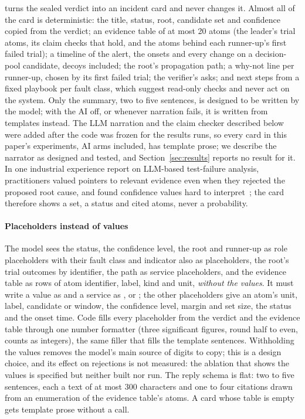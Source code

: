  turns the sealed verdict into an incident card and never changes it.
Almost all of the card is deterministic: the title, status, root, candidate set and confidence copied from the verdict; an evidence table of at most 20 atoms (the leader's trial atoms, its claim checks that hold, and the atoms behind each runner-up's first failed trial); a timeline of the alert, the onsets and every change on a decision-pool candidate, decoys included; the root's propagation path; a why-not line per runner-up, chosen by its first failed trial; the verifier's asks; and next steps from a fixed playbook per fault class, which suggest read-only checks and never act on the system.
Only the summary, two to five sentences, is designed to be written by the model; with the AI off, or whenever narration fails, it is written from templates instead.
The LLM narration and the claim checker described below were added after the code was frozen for the results runs, so every card in this paper's experiments, AI arms included, has template prose; we describe the narrator as designed and tested, and Section~\ref{sec:results} reports no result for it.
In one industrial experience report on LLM-based test-failure analysis, practitioners valued pointers to relevant evidence even when they rejected the proposed root cause, and found confidence values hard to interpret~\cite{westermo2026}; the card therefore shows a set, a status and cited atoms, never a probability.

\paragraph{Placeholders instead of values}
The model sees the status, the confidence level, the root and runner-up as role placeholders with their fault class and indicator also as placeholders, the root's trial outcomes by identifier, the path as service placeholders, and the evidence table as rows of atom identifier, label, kind and unit, \emph{without the values}.
It must write a value as  and a service as ,  or ; the other placeholders give an atom's unit, label, candidate or window, the confidence level, margin and set size, the status and the onset time.
Code fills every placeholder from the verdict and the evidence table through one number formatter (three significant figures, round half to even, counts as integers), the same filler that fills the template sentences.
Withholding the values removes the model's main source of digits to copy; this is a design choice, and its effect on rejections is not measured: the ablation that shows the values is specified but neither built nor run.
The reply schema is flat: two to five sentences, each a text of at most 300 characters and one to four citations drawn from an enumeration of the evidence table's atoms.
A card whose table is empty gets template prose without a call.

